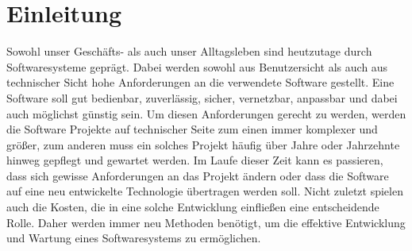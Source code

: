 \chapter{Einleitung}

Sowohl unser Geschäfts- als auch unser Alltagsleben sind heutzutage durch Softwaresysteme geprägt.
Dabei werden sowohl aus Benutzersicht als auch aus technischer Sicht hohe Anforderungen an die
verwendete Software gestellt. Eine Software soll gut bedienbar, zuverlässig, sicher, vernetzbar,
anpassbar und dabei auch möglichst günstig sein. Um diesen Anforderungen gerecht zu werden, werden
die Software Projekte auf technischer Seite zum einen immer komplexer und größer, zum anderen muss
ein solches Projekt häufig über Jahre oder Jahrzehnte hinweg gepflegt und gewartet werden. Im Laufe
dieser Zeit kann es passieren, dass sich gewisse Anforderungen an das Projekt ändern oder dass die
Software auf eine neu entwickelte Technologie übertragen werden soll. Nicht zuletzt spielen auch die
Kosten, die in eine solche Entwicklung einfließen eine entscheidende Rolle. Daher werden immer neu
Methoden benötigt, um die effektive Entwicklung und Wartung eines Softwaresystems zu ermöglichen.


